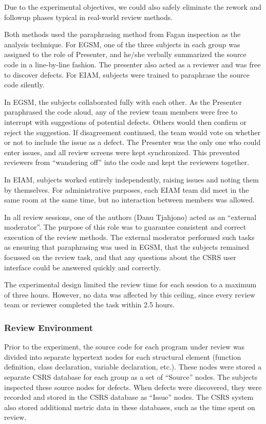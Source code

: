 Due to the experimental objectives, we could also safely eliminate the
rework and followup phases typical in real-world review methods.

Both methods used the paraphrasing method from Fagan inspection as the
analysis technique.  For EGSM, one of the three subjects in each group was
assigned to the role of Presenter, and he/she verbally summarized the
source code in a line-by-line fashion.  The presenter also acted as a
reviewer and was free to discover defects. For EIAM, subjects were 
trained to paraphrase the source code silently.

In EGSM, the subjects collaborated fully with each other. As the Presenter
paraphrased the code aloud, any of the review team members were free to interrupt
with suggestions of potential defects. Others would then confirm or reject
the suggestion.  If disagreement continued, the team would vote on whether
or not to include the issue as a defect.  The Presenter was the only one
who could enter issues, and all review screens were kept synchronized. This
prevented reviewers from ``wandering off'' into the code and kept the
reviewers together.

In EIAM, subjects worked entirely independently, raising issues and noting
them by themselves. For administrative purposes, each EIAM team did meet in
the same room at the same time, but no interaction between members was
allowed.

In all review sessions, one of the authors (Danu Tjahjono) acted as an
``external moderator''.  The purpose of this role was to guarantee
consistent and correct execution of the review methods. The external
moderator performed such tasks as ensuring that paraphrasing was used in
EGSM, that the subjects remained focussed on the review task, and that any
questions about the CSRS user interface could be answered quickly and
correctly.

The experimental design limited the review time for each session to a
maximum of three hours.  However, no data was affected by this ceiling,
since every review team or reviewer completed the task within 2.5 hours.

\subsubsection{Review Environment}

Prior to the experiment, the source code for each program under review was
divided into separate hypertext nodes for each structural element (function
definition, class declaration, variable declaration, etc.).  These nodes
were stored a separate CSRS database for each group as a set of ``Source''
nodes. The subjects inspected these source nodes for defects.  When defects
were discovered, they were recorded and stored in the CSRS database as
``Issue'' nodes. The CSRS system also stored additional metric data in
these databases, such as the time spent on review.  

